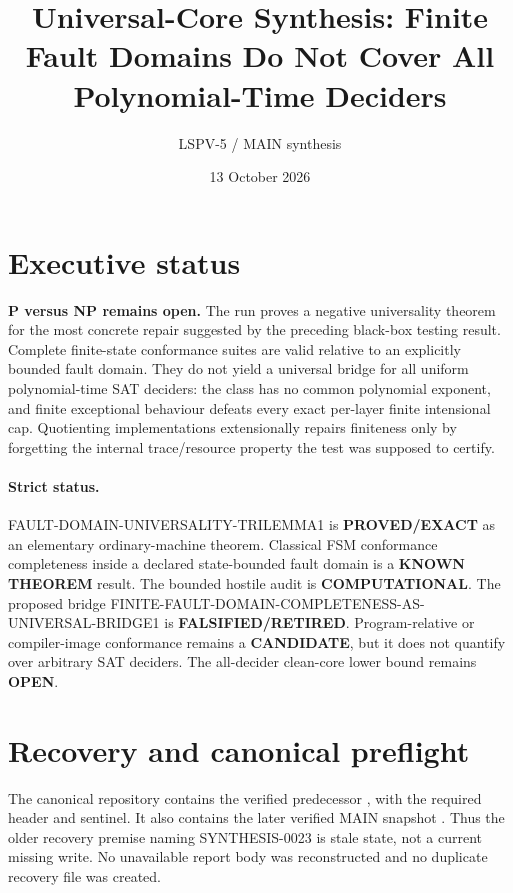 \documentclass[11pt]{article}
\title{Universal-Core Synthesis: Finite Fault Domains Do Not Cover All Polynomial-Time Deciders}
\author{LSPV-5 / MAIN synthesis}
\date{13 October 2026}
\newcommand{\EXACT}{\textbf{PROVED/EXACT}}
\newcommand{\KNOWN}{\textbf{KNOWN THEOREM}}
\newcommand{\COMP}{\textbf{COMPUTATIONAL}}
\newcommand{\CAND}{\textbf{CANDIDATE}}
\newcommand{\OPEN}{\textbf{OPEN}}
\newcommand{\RET}{\textbf{FALSIFIED/RETIRED}}
\begin{document}
\sloppy
\maketitle

\section*{Executive status}
\textbf{P versus NP remains open.}  The run proves a negative universality
theorem for the most concrete repair suggested by the preceding black-box
testing result.  Complete finite-state conformance suites are valid relative
to an explicitly bounded fault domain.  They do not yield a universal bridge
for all uniform polynomial-time SAT deciders: the class has no common
polynomial exponent, and finite exceptional behaviour defeats every exact
per-layer finite intensional cap.  Quotienting implementations extensionally
repairs finiteness only by forgetting the internal trace/resource property the
test was supposed to certify.

\paragraph{Strict status.}
\textsf{FAULT-DOMAIN-UNIVERSALITY-TRILEMMA1} is \EXACT{} as an elementary
ordinary-machine theorem.  Classical FSM conformance completeness inside a
declared state-bounded fault domain is a \KNOWN{} result.  The bounded hostile
audit is \COMP{}.  The proposed bridge
\textsf{FINITE-FAULT-DOMAIN-COMPLETENESS-AS-UNIVERSAL-BRIDGE1} is \RET{}.
Program-relative or compiler-image conformance remains a \CAND{}, but it does
not quantify over arbitrary SAT deciders.  The all-decider clean-core lower
bound remains \OPEN{}.

\section*{Recovery and canonical preflight}
The canonical repository contains the verified predecessor
, with
the required header and sentinel.  It also contains the later verified MAIN
snapshot
.  Thus the older
recovery premise naming SYNTHESIS-0023 is stale state, not a current missing
write.  No unavailable report body was reconstructed and no duplicate recovery
file was created.
\end{document}
